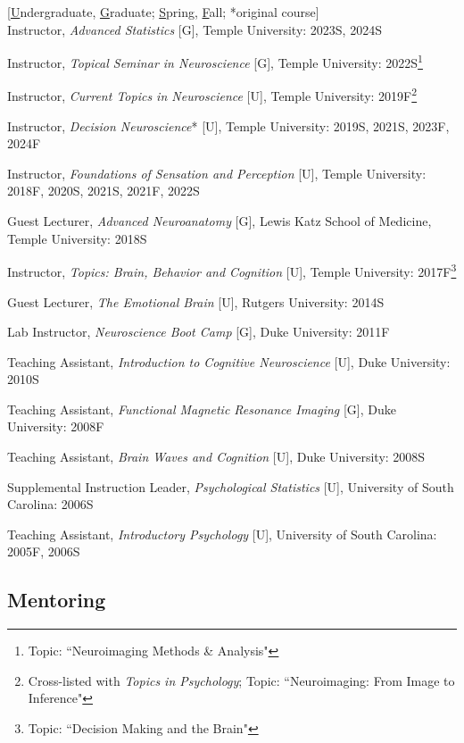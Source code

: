 \documentclass[11pt, letterpaper]{article}
\begin{document}
\begin{hangparas}{.5in}{1}

[\underline{U}ndergraduate, \underline{G}raduate; \underline{S}pring, \underline{F}all; *original course]  \\

Instructor, \textit{Advanced Statistics} [G], Temple University: 2023S, 2024S

Instructor, \textit{Topical Seminar in Neuroscience} [G], Temple University: 2022S\footnote{Topic: ``Neuroimaging Methods \& Analysis"}

Instructor, \textit{Current Topics in Neuroscience} [U], Temple University: 2019F\footnote{Cross-listed with \textit{Topics in Psychology}; Topic: ``Neuroimaging: From Image to Inference"}

Instructor, \textit{Decision Neuroscience}* [U], Temple University: 2019S, 2021S, 2023F, 2024F

Instructor, \textit{Foundations of Sensation and Perception} [U], Temple University: 2018F, 2020S, 2021S, 2021F, 2022S

Guest Lecturer, \textit{Advanced Neuroanatomy} [G], Lewis Katz School of Medicine, Temple University: 2018S

Instructor, \textit{Topics: Brain, Behavior and Cognition} [U], Temple University: 2017F\footnote{Topic: ``Decision Making and the Brain"}

Guest Lecturer, \textit{The Emotional Brain} [U], Rutgers University: 2014S

Lab Instructor, \textit{Neuroscience Boot Camp} [G], Duke University: 2011F

Teaching Assistant, \textit{Introduction to Cognitive Neuroscience} [U], Duke University: 2010S

Teaching Assistant, \textit{Functional Magnetic Resonance Imaging} [G], Duke University: 2008F

Teaching Assistant, \textit{Brain Waves and Cognition} [U], Duke University: 2008S

Supplemental Instruction Leader, \textit{Psychological Statistics} [U], University of South Carolina: 2006S

Teaching Assistant, \textit{Introductory Psychology} [U], University of South Carolina: 2005F, 2006S \\

\end{hangparas}


\subsection*{Mentoring}
\end{document}
